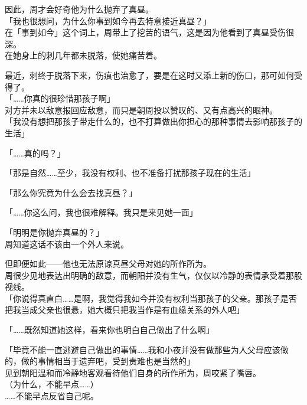 因此，周才会好奇他为什么抛弃了真昼。\\

「我也很想问，为什么你事到如今再去特意接近真昼？」\\

在「事到如今」这个词上，周带上了挖苦的语气，这是因为他看到了真昼受伤很深。\\

在她身上的刺几年都未脱落，使她痛苦着。

最近，刺终于脱落下来，伤痕也治愈了，要是在这时又添上新的伤口，那可如何受得了。\\

「……你真的很珍惜那孩子啊」\\

对方并未以敌意报回应敌意，而只是朝周投以赞叹的、又有点高兴的眼神。\\

「我没有想把那孩子带走什么的，也不打算做出你担心的那种事情去影响那孩子的生活」

「……真的吗？」

「那是自然……至少，我没有权利、也不准备打扰那孩子现在的生活」

「那么你究竟为什么会去找真昼？」

「……你这么问，我也很难解释。我只是来见她一面」

「明明是你抛弃真昼的？」\\

周知道这话不该由一个外人来说。

但即便如此——他也无法原谅真昼父母对她的所作所为。\\

周很少见地表达出明确的敌意，而朝阳并没有生气，仅仅以冷静的表情承受着那股视线。\\

「你说得真直白……是啊，我觉得我如今并没有权利当那孩子的父亲。那孩子是否把我当成父亲也很悬，她大概只把我当作是有血缘关系的外人吧」

「……既然知道她这样，看来你也明白自己做出了什么啊」

「毕竟不能一直逃避自己做出的事情……我和小夜并没有做那些为人父母应该做的，做的事情相当于遗弃吧，受到责难也是当然的」\\

见到朝阳温和而冷静地客观看待他们自身的所作所为，周咬紧了嘴唇。\\

（为什么，不能早点……）\\

……不能早点反省自己呢。

